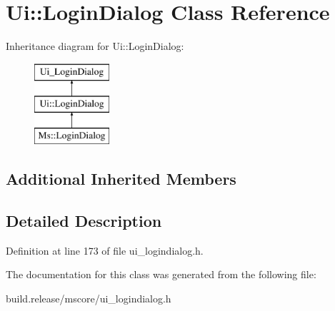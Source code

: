 \hypertarget{class_ui_1_1_login_dialog}{}\section{Ui\+:\+:Login\+Dialog Class Reference}
\label{class_ui_1_1_login_dialog}
Inheritance diagram for Ui\+:\+:Login\+Dialog\+:\begin{figure}[H]
\begin{center}
\leavevmode
\includegraphics[height=3.000000cm]{class_ui_1_1_login_dialog}
\end{center}
\end{figure}
\subsection*{Additional Inherited Members}


\subsection{Detailed Description}


Definition at line 173 of file ui\+\_\+logindialog.\+h.



The documentation for this class was generated from the following file\+:\begin{DoxyCompactItemize}
\item 
build.\+release/mscore/ui\+\_\+logindialog.\+h\end{DoxyCompactItemize}
